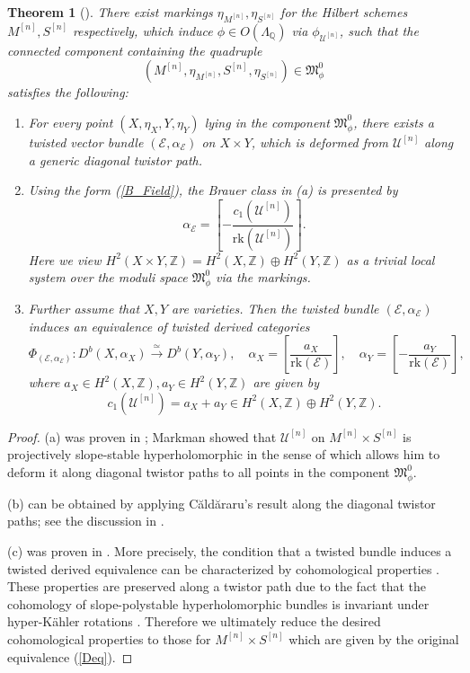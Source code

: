 \documentclass[11pt]{amsart}
\theoremstyle{plain}
\newtheorem{thm}{Theorem}[section]
\theoremstyle{definition}
\theoremstyle{remark}
\newcommand{\BZ}{{\mathbb{Z}}}
\newcommand{\CE}{{\mathcal E}}
\newcommand{\CU}{{\mathcal U}}
\newcommand{\FM}{{\mathfrak{M}}}
\begin{document}
\begin{thm}[\cite{Markman, Polish}]\label{thm1.4}
There exist markings $\eta_{M^{[n]}} ,\eta_{S^{[n]}}$ for the Hilbert schemes $M^{[n]}, S^{[n]}$ respectively, which induce $\phi \in O(\Lambda_\mathbb{Q})$ via $\phi_{\CU^{[n]}}$, such that the connected component containing the quadruple 
\[
(M^{[n]}, \eta_{M^{[n]}}, S^{[n]}, \eta_{S^{[n]}}) \in \FM^0_{\phi}
\]
satisfies the following:
\begin{enumerate}
    \item[(a)] For every point $(X, \eta_X, Y, \eta_Y)$ lying in the component $\FM^0_{\phi}$, there exists a twisted vector bundle $(\CE, \alpha_\CE)$ on $X \times Y$, which is deformed from $\CU^{[n]}$ along a generic diagonal twistor path.
    \item[(b)] Using the form (\ref{B_Field}), the Brauer class in (a) is presented by 
    \[
    \alpha_\CE = \left[- \frac{c_1(\CU^{[n]})}{\mathrm{rk}(\CU^{[n]})} \right]. 
    \]
    Here we view $H^2(X\times Y, \BZ) = H^2(X, \BZ) \oplus H^2(Y, \BZ)$ as a trivial local system over the moduli space $\FM^0_{\phi}$ via the markings.
    \item[(c)] Further assume that $X, Y$ are varieties. Then the twisted bundle $(\CE, \alpha_\CE)$ induces an equivalence of twisted derived categories
    \[
    \Phi_{(\CE, \alpha_\CE)}: D^b(X, \alpha_X) \xrightarrow{\simeq} D^b(Y, \alpha_Y), \quad \alpha_X = \left[ \frac{a_X}{\mathrm{rk}(\CE)}\right], \quad \alpha_Y = \left[-\frac{a_Y}{\mathrm{rk}(\CE)} \right],
    \]
    where $a_X \in H^2(X, \BZ), a_Y \in H^2(Y, \BZ)$ are given by 
    \[
    c_1(\CU^{[n]})  = a_X + a_Y \in H^2(X, \BZ) \oplus H^2(Y, \BZ).
    \]
\end{enumerate}
\end{thm}

\begin{proof}
(a) was proven in \cite[Theorem 8.4]{Markman}; Markman showed that $\CU^{[n]}$ on $M^{[n]}\times S^{[n]}$ is projectively slope-stable hyperholomorphic in the sense of \cite{Verb, BB} which allows him to deform it along diagonal twistor paths to all points in the component $\FM^0_{\phi}$.


(b) can be obtained by applying C\u{a}ld\u{a}raru's result \cite[Theorem 4.1]{Ca} along the diagonal twistor paths; see the discussion in \cite[Section 2.3]{Polish}.

(c) was proven in \cite[Theorem 2.3]{Polish}. More precisely, the condition that a twisted bundle induces a twisted derived equivalence can be characterized by cohomological properties \cite[Theorem~3.2.1]{Ca0}. These properties are preserved along a twistor path due to the fact that the cohomology of slope-polystable hyperholomorphic bundles is invariant under hyper-K\"ahler rotations \cite[Corollary 8.1]{Verb2}. Therefore we ultimately reduce the desired cohomological properties to those for $M^{[n]} \times S^{[n]}$ which are given by the original equivalence (\ref{Deq}).
\end{proof}
\end{document}
